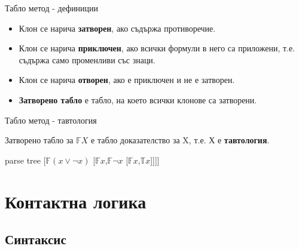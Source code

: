 \documentclass[14pt, aspectratio=169]{beamer}
\newcommand\ST{\mathbb{T}}
\newcommand\SF{\mathbb{F}}
\begin{document}
\begin{frame}{Табло метод - дефиниции}
	\begin{itemize}
		\item<1-> Клон се нарича \textbf{затворен}, ако съдържа противоречие.
		\item<2-> Клон се нарича \textbf{приключен}, ако всички формули в него са приложени, т.е. съдържа само променливи със знаци.
		\item<3-> Клон се нарича \textbf{отворен}, ако е приключен и не е затворен.
		\item<4-> \textbf{Затворено табло} е табло, на което всички клонове са затворени.
	\end{itemize}
\end{frame}

\begin{frame}{Табло метод - тавтология}
	\begin{lemma}
		Затворено табло за $\SF X$ е табло доказателство за X, т.е. Х е \textbf{тавтология}.
	\end{lemma}
	\small
	\begin{example}
		\begin{center}
		\begin{forest}
			parse tree
			[$\SF (x \lor \neg x)$ [$\SF x \mbox{,} \SF \neg x$ [$\SF x \mbox{,} \ST x$]]]]
		\end{forest}
		\end{center}
	\end{example}
\end{frame}



\section{Контактна логика}
\subsection{Синтаксис}
\end{document}
